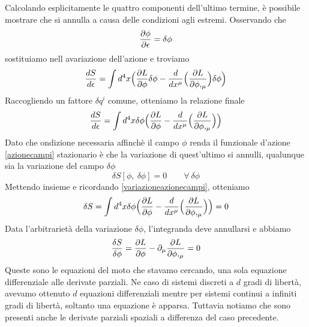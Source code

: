     Calcolando esplicitamente le quattro componenti dell'ultimo termine, è possibile mostrare che si annulla a causa delle condizioni agli estremi. Osservando che 
\begin{equation}
    \frac{\partial\phi}{\partial\epsilon} = \delta \phi
\end{equation}
    sostituiamo nell avariazione dell'azione e troviamo
\begin{equation*}
    \frac{dS}{d\epsilon} = \int d^4 x \Big (\frac{\partial L}{\partial\phi} \delta \phi - \frac{d}{dx^\mu} \Big (\frac{\partial L}{\partial\phi,_\mu} \Big) \delta \phi \Big) 
\end{equation*}
    Raccogliendo un fattore $\delta q^i$ comune, otteniamo la relazione finale
\begin{equation}
    \frac{dS}{d\epsilon} = \int d^4 x \delta \phi \Big (\frac{\partial L}{\partial\phi} - \frac{d}{dx^\mu} \Big (\frac{\partial L}{\partial\phi,_\mu} \Big) \Big) 
\end{equation}
    Dato che ondizione necessaria affinchè il campo $\phi$ renda il funzionale d'azione \eqref{azionecampi} stazionario è che la variazione di quest'ultimo si annulli, qualunque sia la variazione del campo $\delta \phi$
\begin{equation}
    \delta S[\phi, ~ \delta \phi] = 0 \qquad \forall ~ \delta \phi
\end{equation}
    Mettendo insieme e ricordando \eqref{variazioneazionecampi}, otteniamo
\begin{equation*}
    \delta S = \int d^4 x \delta \phi \Big (\frac{\partial L}{\partial\phi} - \frac{d}{dx^\mu} \Big (\frac{\partial L}{\partial\phi,_\mu} \Big) \Big)  = 0
\end{equation*}
    Data l'arbitrarietà della variazione $\delta \phi$, l'integranda deve annullarsi e abbiamo
\begin{equation} \label{eullagcampi}
    \frac{\delta S}{\delta \phi} = \frac{\partial L}{\partial\phi} - \partial_\mu \frac{\partial L}{\partial\phi,_\mu} = 0
\end{equation}
    Queste sono le equazioni del moto che stavamo cercando, una sola equazione differenziale alle derivate parziali. Ne caso di sistemi discreti a $d$ gradi di libertà, avevamo ottenuto $d$ equazioni differenziali mentre per sistemi continui a infiniti gradi di libertà, soltanto una equazione è apparsa. Tuttavia notiamo che sono presenti anche le derivate parziali spaziali a differenza del caso precedente.

